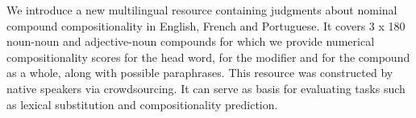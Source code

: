 We introduce a new multilingual resource containing judgments about nominal compound  compositionality in English, French and Portuguese. It covers 3 x 180 noun-noun and adjective-noun compounds for which we provide numerical compositionality scores for the head word, for the modifier and for the compound as a whole, along with possible paraphrases. This resource was constructed by native speakers via crowdsourcing. It can serve as basis for evaluating tasks such as lexical substitution and compositionality prediction.
